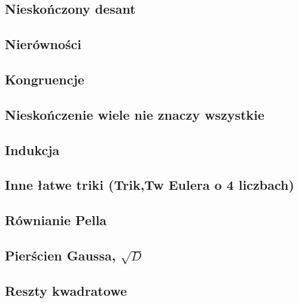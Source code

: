 \documentclass[10pt,a4paper]{article}
\theoremstyle{plain}
\theoremstyle{definition}
\theoremstyle{remark}
\begin{document}
	\subsection{Nieskończony desant}
	\subsection{Nierówności}
	\subsection{Kongruencje}
	\subsection{Nieskończenie wiele nie znaczy wszystkie}
	\subsection{Indukcja}
	\subsection{Inne łatwe triki (Trik,Tw Eulera o 4 liczbach)}
	\subsection{Równianie Pella}
	\subsection{Pierścien Gaussa, $\sqrt{D}$}
	\subsection{Reszty kwadratowe}
\end{document}
